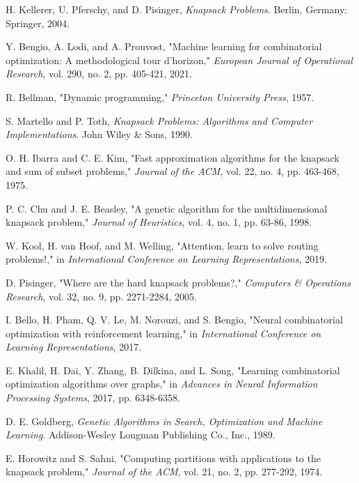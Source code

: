 \documentclass[conference, a4paper]{IEEEtran}
\begin{document}
\begin{thebibliography}{00}
 H. Kellerer, U. Pferschy, and D. Pisinger, \textit{Knapsack Problems}. Berlin, Germany: Springer, 2004.

 Y. Bengio, A. Lodi, and A. Prouvost, "Machine learning for combinatorial optimization: A methodological tour d'horizon," \textit{European Journal of Operational Research}, vol. 290, no. 2, pp. 405-421, 2021.

 R. Bellman, "Dynamic programming," \textit{Princeton University Press}, 1957.

 S. Martello and P. Toth, \textit{Knapsack Problems: Algorithms and Computer Implementations}. John Wiley \& Sons, 1990.

 O. H. Ibarra and C. E. Kim, "Fast approximation algorithms for the knapsack and sum of subset problems," \textit{Journal of the ACM}, vol. 22, no. 4, pp. 463-468, 1975.

 P. C. Chu and J. E. Beasley, "A genetic algorithm for the multidimensional knapsack problem," \textit{Journal of Heuristics}, vol. 4, no. 1, pp. 63-86, 1998.

 W. Kool, H. van Hoof, and M. Welling, "Attention, learn to solve routing problems!," in \textit{International Conference on Learning Representations}, 2019.

 D. Pisinger, "Where are the hard knapsack problems?," \textit{Computers & Operations Research}, vol. 32, no. 9, pp. 2271-2284, 2005.

 I. Bello, H. Pham, Q. V. Le, M. Norouzi, and S. Bengio, "Neural combinatorial optimization with reinforcement learning," in \textit{International Conference on Learning Representations}, 2017.

 E. Khalil, H. Dai, Y. Zhang, B. Dilkina, and L. Song, "Learning combinatorial optimization algorithms over graphs," in \textit{Advances in Neural Information Processing Systems}, 2017, pp. 6348-6358.

 D. E. Goldberg, \textit{Genetic Algorithms in Search, Optimization and Machine Learning}. Addison-Wesley Longman Publishing Co., Inc., 1989.

 E. Horowitz and S. Sahni, "Computing partitions with applications to the knapsack problem," \textit{Journal of the ACM}, vol. 21, no. 2, pp. 277-292, 1974.


\end{thebibliography}
\end{document}
